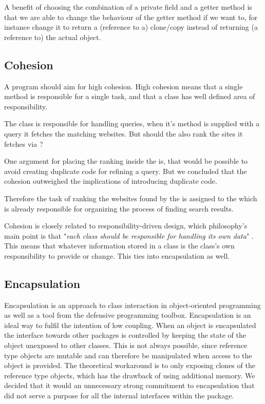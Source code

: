 A benefit of choosing the combination of a private field and a getter method is that we are able to change the behaviour of the getter method if we want to, for instance change it to return a (reference to a) clone/copy instead of returning (a reference to) the actual object. 


\subsection{Cohesion}
A program should aim for high cohesion. %
High cohesion means that a single method is responsible for a single task, and that a class has well defined area of responsibility. 

The class  is responsible for handling queries, when it's method  is supplied with a query it fetches the matching websites. But should the  also rank the sites it fetches via ? 

One argument for placing the ranking inside the  is, that would be possible to avoid creating duplicate code for refining a query. But we concluded that the cohesion outweighed the implications of introducing duplicate code.

Therefore the task of ranking the websites found by the  is assigned to the   which is already responsible for organizing the process of finding search results.

Cohesion is closely related to responsibility-driven design, which philosophy's main point is that "\textit{each class should be responsible for handling its own data}" \citep{270}. This means that whatever information stored in a class is the class's own responsibility to provide or change. This ties into encapsulation as well. %

\subsection{Encapsulation}
Encapsulation is an approach to class interaction in object-oriented programming as well as a tool from the defensive programming toolbox. Encapsulation is an ideal way to fulfil the intention of low coupling. When an object is encapsulated the interface towards other packages is controlled by keeping the state of the object unexposed to other classes. This is not always possible, since reference type objects are mutable and can therefore be manipulated when access to the object is provided. The theoretical workaround is to only exposing clones of the reference type objects, which has the drawback of using additional memory. We decided that it would an unnecessary strong commitment to encapsulation that did not serve a purpose for all the internal interfaces within the  package.

